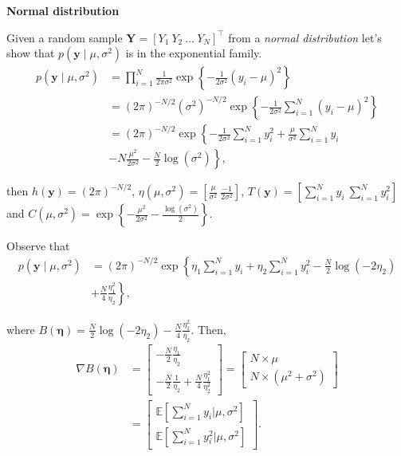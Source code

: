 \begin{enumerate}
\textbf{Normal distribution} 

Given a random sample $\bm{Y}=[Y_1 \ Y_2 \ \dots \ Y_N]^{\top}$ from a \textit{normal distribution} let's show that $p(\bm{y}\mid \mu,\sigma^2)$ is in the exponential family.
\begin{align}
	p(\bm{y}\mid \mu,\sigma^2)&=\prod_{i=1}^N \frac{1}{2\pi\sigma^2}\exp\left\{-\frac{1}{2\sigma^2}\left(y_i-\mu\right)^2\right\}\nonumber\\
	&= (2\pi)^{-N/2}(\sigma^2)^{-N/2}\exp\left\{-\frac{1}{2\sigma^2}\sum_{i=1}^N\left(y_i-\mu\right)^2\right\}\nonumber\\
	&= (2\pi)^{-N/2}\exp\left\{-\frac{1}{2\sigma^2}\sum_{i=1}^Ny_i^2+\frac{\mu}{\sigma^2}\sum_{i=1}^N y_i\right.\nonumber\\
	&-\left.N\frac{\mu^2}{2\sigma^2}-\frac{N}{2}\log(\sigma^2)\right\}\nonumber,	
\end{align}

then $h(\bm{y})=(2\pi)^{-N/2}$, $\eta(\mu,\sigma^2)=\left[\frac{\mu}{\sigma^2} \ \frac{-1}{2\sigma^2}\right]$, $T(\bm{y})=\left[\sum_{i=1}^N y_i \ \sum_{i=1}^N y_i^2\right]$ and $C(\mu,\sigma^2)=\exp\left\{-\frac{\mu^2}{2\sigma^2}-\frac{\log(\sigma^2)}{2}\right\}$.

Observe that 
\begin{align}
	p(\bm{y}\mid \mu,\sigma^2)&= (2\pi)^{-N/2}\exp\left\{\eta_1\sum_{i=1}^N y_i+\eta_2\sum_{i=1}^Ny_i^2-\frac{N}{2}\log(-2\eta_2)\right.\nonumber\\
	&\left.+\frac{N}{4}\frac{\eta_1^2}{\eta_2}\right\}\nonumber,
\end{align}

where $B(\bm{\eta})=\frac{N}{2}\log(-2\eta_2)-\frac{N}{4}\frac{\eta_1^2}{\eta_2}$. Then,
\begin{align*}
	\nabla B(\bm{\eta}) & = \begin{bmatrix}
		-\frac{N}{2}\frac{\eta_1}{\eta_2}\\
		-\frac{N}{2}\frac{1}{\eta_2}+\frac{N}{4}\frac{\eta_1^2}{\eta_2^2}
	\end{bmatrix}
	=
	\begin{bmatrix}
		N\times\mu\\
		N\times(\mu^2+\sigma^2)
	\end{bmatrix}\\
	&  = \begin{bmatrix}
		\mathbb{E}\left[\sum_{i=1}^N y_i\bigr\rvert \mu,\sigma^2\right]\\
		\mathbb{E}\left[\sum_{i=1}^N y_i^2\bigr\rvert \mu,\sigma^2\right]
	\end{bmatrix}. 
\end{align*}
\\


\end{enumerate}
